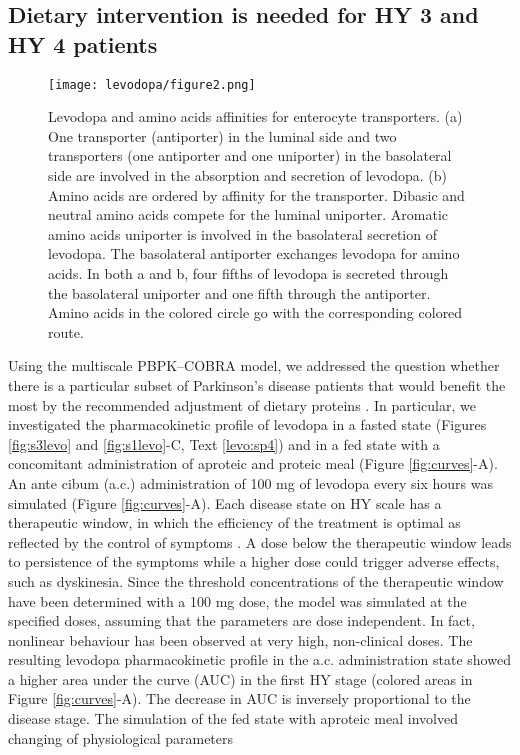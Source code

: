 \subsection{Dietary intervention is needed for HY 3 and HY 4 patients}
\begin{figure}[!htp]
\centering
	\texttt{[image: levodopa/figure2.png]}%
	\caption[Levodopa and amino acids affinities for enterocyte transporters.]{Levodopa and amino acids affinities for enterocyte transporters. (a) One transporter (antiporter) in the luminal side and two transporters (one antiporter and one uniporter) in the
basolateral side are involved in the absorption and secretion of
levodopa. (b) Amino acids are ordered by affinity for the transporter.
Dibasic and neutral amino acids compete for the luminal uniporter.
Aromatic amino acids uniporter is involved in the basolateral
secretion of levodopa. The basolateral antiporter exchanges
levodopa for amino acids. In both a and b, four fifths of levodopa
is secreted through the basolateral uniporter and one fifth through
the antiporter. Amino acids in the colored circle go with the
corresponding colored route.}
	\label{fig:levoaa}
\end{figure}
Using the multiscale PBPK–COBRA model, we addressed the question whether there is a particular subset of Parkinson's disease patients that would benefit the most by the recommended adjustment of dietary proteins\cite{contin2010pharmacokinetics} \cite{cereda2010low}. In particular, we investigated the pharmacokinetic profile of levodopa in a fasted state (Figures \ref{fig:s3levo} and \ref{fig:s1levo}-C, Text \ref{levo:sp4}) and in a fed state with a concomitant administration of aproteic and proteic meal (Figure \ref{fig:curves}-A). An ante cibum (a.c.) administration of 100 mg of levodopa every six hours was simulated (Figure \ref{fig:curves}-A). Each disease state on HY scale has a therapeutic window, in which the efficiency of the treatment is optimal as reflected by the control of symptoms \cite{contin2010pharmacokinetics}. A dose below the therapeutic window leads to persistence of the symptoms while a higher dose could trigger adverse effects, such as dyskinesia. Since the threshold concentrations of the therapeutic window have been determined with a 100 mg dose\cite{contin2010pharmacokinetics}, the model was simulated at the specified doses, assuming that the parameters are dose independent. In fact, nonlinear behaviour has been observed at very high, non-clinical doses\cite{lennernas1993effect}. The resulting levodopa pharmacokinetic profile in the a.c. administration state showed a higher area under the curve (AUC) in the first HY stage (colored areas in Figure \ref{fig:curves}-A). The decrease in AUC is inversely proportional to the disease stage. The simulation of the fed state with aproteic meal involved changing of physiological parameters
